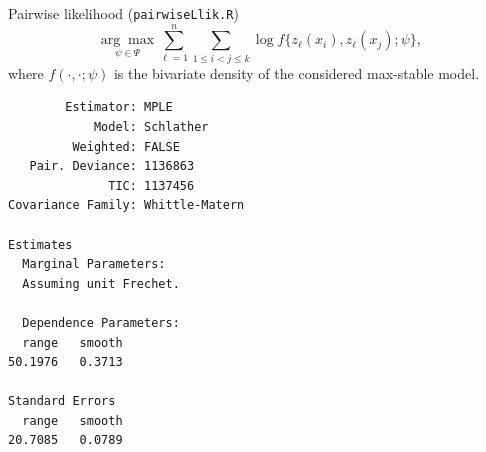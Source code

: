 \documentclass[blackslide,style=simple]{powerdot}
\theoremstyle{plain}%
\theoremstyle{definition}
\theoremstyle{remark}
\begin{document}
\begin{wideslide}[toc=Pairwise likelihood,method=file]{Pairwise
    likelihood (\texttt{pairwiseLlik.R})}
  \vspace*{-2em}
  \begin{equation*}
    \underset{\psi \in \Psi}{\arg \max} \sum_{\ell = 1}^n \sum_{1 \leq
      i < j \leq k} \log f\{z_\ell(x_i), z_\ell(x_j); \psi\},
  \end{equation*}
  where $f(\cdot, \cdot; \psi)$ is the bivariate density of the
  considered max-stable model.

    \begin{minipage}[l]{.33\linewidth}
      {\tiny
\begin{verbatim}
        Estimator: MPLE 
            Model: Schlather 
         Weighted: FALSE 
   Pair. Deviance: 1136863 
              TIC: 1137456 
Covariance Family: Whittle-Matern 

Estimates
  Marginal Parameters:
  Assuming unit Frechet.

  Dependence Parameters:
  range   smooth  
50.1976   0.3713  

Standard Errors
  range   smooth  
20.7085   0.0789  


\end{verbatim}}
\end{minipage}
\end{wideslide}
\end{document}
